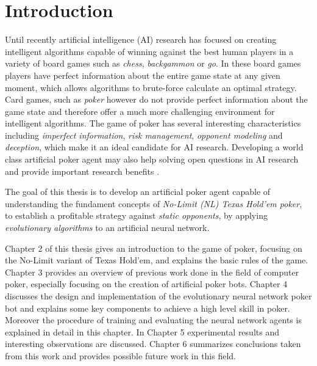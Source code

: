 

\chapter{Introduction}
\label{cha:introduction}

Until recently artificial intelligence (AI) research has focused on creating intelligent algorithms capable of winning against the best human players in a variety of board games such as \textit{chess}, \textit{backgammon} or \textit{go}. In these board games players have perfect information about the entire game state at any given moment, which allows algorithms to brute-force calculate an optimal strategy. Card games, such as \textit{poker} however do not provide perfect information about the game state and therefore offer a much more challenging environment for intelligent algorithms. The game of poker has several interesting characteristics including \textit{imperfect information}, \textit{risk management}, \textit{opponent modeling} and \textit{deception}, which make it an ideal candidate for AI research. Developing a world class artificial poker agent may also help solving open questions in AI research and provide important research benefits \cite{challenge_of_poker, pena}.\par
 The goal of this thesis is to develop an artificial poker agent capable of understanding the fundament concepts of \textit{No-Limit (NL) Texas Hold'em poker}, to establish a profitable strategy against \textit{static opponents}, by applying \textit{evolutionary algorithms} to an artificial neural network.\par
 Chapter 2 of this thesis gives an introduction to the game of poker, focusing on the No-Limit variant of Texas Hold'em, and explains the basic rules of the game. Chapter 3 provides an overview of previous work done in the field of computer poker, especially focusing on the creation of artificial poker bots. Chapter 4 discusses the design and implementation of the evolutionary neural network poker bot and explains some key components to achieve a high level skill in poker. Moreover the procedure of training and evaluating the neural network agents is explained in detail in this chapter. In Chapter 5 experimental results and interesting observations are discussed. Chapter 6 summarizes conclusions taken from this work and provides possible future work in this field. 

